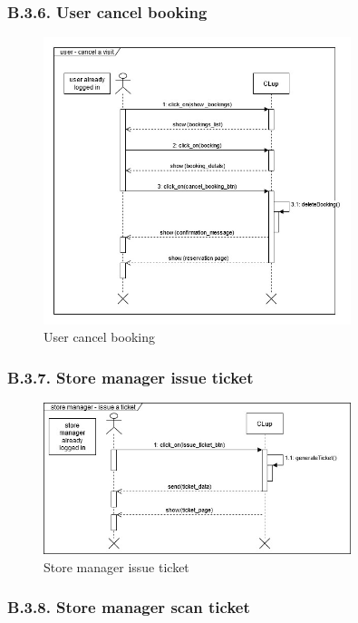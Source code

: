 \subsubsection{B.3.6. User cancel booking}

\begin{figure}[H]
\centering
\includegraphics[width=0.8\textwidth]{sequence_diagrams/sequence_diagram_user_cancel_booking}
\caption{User cancel booking}
\end{figure}

\subsubsection{B.3.7. Store manager issue ticket}

\begin{figure}[H]
\centering
\includegraphics[width=0.8\textwidth]{sequence_diagrams/sequence_diagram_store_manager_issue_ticket}
\caption{Store manager issue ticket}
\end{figure}

\subsubsection{B.3.8. Store manager scan ticket}

